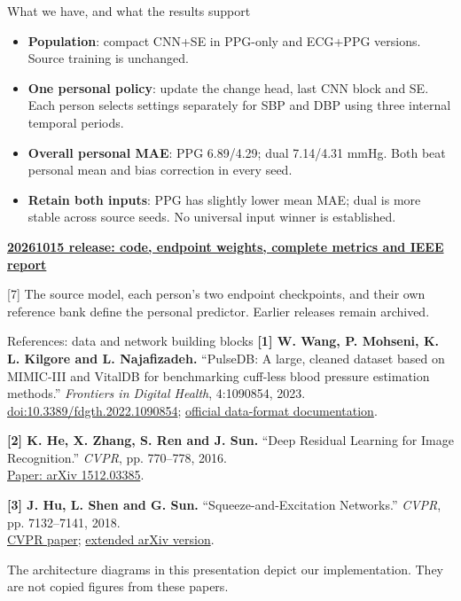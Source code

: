 \documentclass[aspectratio=169,11pt]{beamer}
\newcommand{\stagecontext}{Data and terminology}
\newcommand{\stage}[1]{\gdef\stagecontext{#1}}
\newcommand{\source}[1]{\vfill\par{\fontsize{7}{8}\selectfont\color{Muted}#1}}
\begin{document}
\stage{Summary: shared model and separate personal copies}
\begin{frame}{What we have, and what the results support}

\begin{itemize}\setlength\itemsep{3mm}
\item \textbf{Population}: compact CNN+SE in PPG-only and ECG+PPG versions. Source training is unchanged.
\item \textbf{One personal policy}: update the change head, last CNN block and SE. Each person selects settings separately for SBP and DBP using three internal temporal periods.
\item \textbf{Overall personal MAE}: PPG 6.89/4.29; dual 7.14/4.31 mmHg. Both beat personal mean and bias correction in every seed.
\item \textbf{Retain both inputs}: PPG has slightly lower mean MAE; dual is more stable across source seeds. No universal input winner is established.
\end{itemize}
\par\medskip
\href{https://github.com/place-bot/Bad-Blood/tree/research/v2-vitaldb-attention-personalization/model\%20training/v2/final_results_20261015}{\textbf{20261015 release: code, endpoint weights, complete metrics and IEEE report}}
\source{[7] The source model, each person's two endpoint checkpoints, and their own reference bank define the personal predictor. Earlier releases remain archived.}

\end{frame}

\stage{References}
\begin{frame}{References: data and network building blocks}
\small
\textbf{[1] W. Wang, P. Mohseni, K. L. Kilgore and L. Najafizadeh.} ``PulseDB: A large, cleaned dataset based on MIMIC-III and VitalDB for benchmarking cuff-less blood pressure estimation methods.'' \emph{Frontiers in Digital Health}, 4:1090854, 2023.\\
\href{https://doi.org/10.3389/fdgth.2022.1090854}{doi:10.3389/fdgth.2022.1090854}; \href{https://github.com/pulselabteam/PulseDB}{official data-format documentation}.
\par\medskip
\textbf{[2] K. He, X. Zhang, S. Ren and J. Sun.} ``Deep Residual Learning for Image Recognition.'' \emph{CVPR}, pp. 770--778, 2016.\\
\href{https://arxiv.org/abs/1512.03385}{Paper: arXiv 1512.03385}.
\par\medskip
\textbf{[3] J. Hu, L. Shen and G. Sun.} ``Squeeze-and-Excitation Networks.'' \emph{CVPR}, pp. 7132--7141, 2018.\\
\href{https://openaccess.thecvf.com/content_cvpr_2018/html/Hu_Squeeze-and-Excitation_Networks_CVPR_2018_paper.html}{CVPR paper}; \href{https://arxiv.org/abs/1709.01507}{extended arXiv version}.
\source{The architecture diagrams in this presentation depict our implementation. They are not copied figures from these papers.}
\end{frame}
\end{document}
